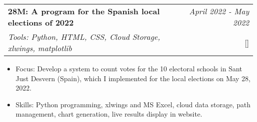 \documentclass[a4paper,11pt]{article}
\makeatletter
\newcommand{\resumeProject}[4]{
\vspace{0.5mm}\item
    \begin{tabular*}{0.98\textwidth}[t]{l@{\extracolsep{\fill}}r}
        \textbf{#1} & \textit{\footnotesize{#3}} \\
        \footnotesize{\textit{#2}} & \footnotesize{#4}
    \end{tabular*}
    \vspace{-2.4mm}
}
\newcommand{\resumeItemListStart}{\begin{itemize}[leftmargin=*,labelsep=1mm,itemsep=0.5mm]}
\newcommand{\resumeItemListEnd}{\end{itemize}\vspace{-2mm}}
\makeatother
\begin{document}
{\resumeProject
  {28M: A program for the Spanish local elections of 2022}
  {Tools: Python, HTML, CSS, Cloud Storage, xlwings, matplotlib}
  {April 2022 - May 2022}
  {{}[\href{https://github.com/joanalnu/28M}{\textcolor{darkblue}{\faGithub}}]}
\resumeItemListStart
  \item Focus: Develop a system to count votes for the 10 electoral schools in Sant Just Desvern (Spain), which I implemented for the local elections on May 28, 2022.
  \item Skills: Python programming, xlwings and MS Excel, cloud data storage, path management, chart generation, live results display in website.
\resumeItemListEnd







}
\end{document}

